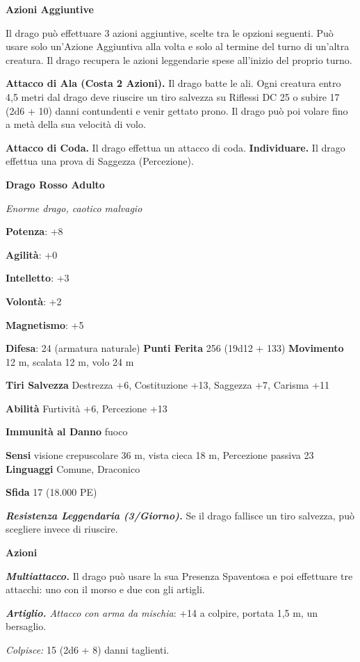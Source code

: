 \begin{multicols}{2}
\textbf{Azioni Aggiuntive}

Il drago può effettuare 3 azioni aggiuntive, scelte tra le opzioni
seguenti. Può usare solo un'Azione Aggiuntiva alla volta e solo al
termine del turno di un'altra creatura. Il drago recupera le azioni
leggendarie spese all'inizio del proprio turno.

\textbf{Attacco di Ala (Costa 2 Azioni).} Il drago batte le ali. Ogni
creatura entro 4,5 metri dal drago deve riuscire un tiro salvezza su Riflessi DC 25 o subire 17 (2d6 + 10) danni contundenti e venir gettato
prono. Il drago può poi volare fino a metà della sua velocità di volo.

\textbf{Attacco di Coda.} Il drago effettua un attacco di coda.
\textbf{Individuare.} Il drago effettua una prova di Saggezza
(Percezione).

\textbf{Drago Rosso Adulto}

\emph{Enorme drago, caotico malvagio}

\textbf{Potenza}: +8

\textbf{Agilità}: +0

\textbf{Intelletto}: +3

\textbf{Volontà}: +2

\textbf{Magnetismo}: +5

\textbf{Difesa}: 24 (armatura naturale) \textbf{Punti Ferita}
256 (19d12 + 133) \textbf{Movimento} 12 m, scalata 12 m, volo 24 m

\textbf{Tiri Salvezza} Destrezza +6, Costituzione +13, Saggezza +7,
Carisma +11

\textbf{Abilità} Furtività +6, Percezione +13

\textbf{Immunità al Danno} fuoco

\textbf{Sensi} visione crepuscolare 36 m, vista cieca 18 m, Percezione passiva
23 \textbf{Linguaggi} Comune, Draconico

\textbf{Sfida} 17 (18.000 PE)

\emph{\textbf{Resistenza Leggendaria (3/Giorno).}} Se il drago fallisce
un tiro salvezza, può scegliere invece di riuscire.

\textbf{Azioni}

\emph{\textbf{Multiattacco.}} Il drago può usare la sua Presenza
Spaventosa e poi effettuare tre attacchi: uno con il morso e due con gli
artigli.

\emph{\textbf{Artiglio.} Attacco con arma da mischia}: +14 a colpire,
portata 1,5 m, un bersaglio.

\emph{Colpisce:} 15 (2d6 + 8) danni taglienti.


\end{multicols}
